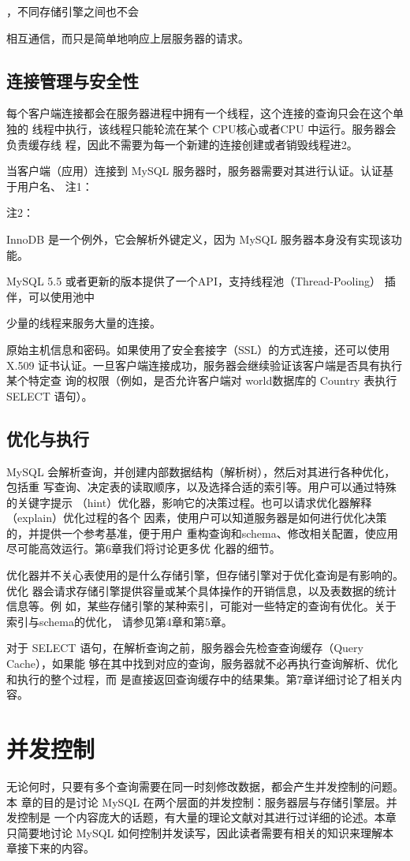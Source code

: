 ，不同存储引擎之间也不会

相互通信，而只是简单地响应上层服务器的请求。

\subsection{连接管理与安全性}
每个客户端连接都会在服务器进程中拥有一个线程，这个连接的查询只会在这个单独的
线程中执行，该线程只能轮流在某个 CPU核心或者CPU 中运行。服务器会负责缓存线
程，因此不需要为每一个新建的连接创建或者销毁线程进2。

当客户端（应用）连接到 MySQL 服务器时，服务器需要对其进行认证。认证基于用户名、
注1：

注2：

InnoDB 是一个例外，它会解析外键定义，因为 MySQL 服务器本身没有实现该功能。

MySQL 5.5 或者更新的版本提供了一个API，支持线程池（Thread-Pooling） 插伴，可以使用池中

少量的线程来服务大量的连接。

原始主机信息和密码。如果使用了安全套接字（SSL）的方式连接，还可以使用X.509
证书认证。一旦客户端连接成功，服务器会继续验证该客户端是否具有执行某个特定查
询的权限（例如，是否允许客户端对 world数据库的 Country 表执行 SELECT 语句）。

\subsection{优化与执行}
MySQL 会解析查询，并创建内部数据结构（解析树），然后对其进行各种优化，包括重
写查询、决定表的读取顺序，以及选择合适的索引等。用户可以通过特殊的关键字提示
（hint）优化器，影响它的决策过程。也可以请求优化器解释（explain）优化过程的各个
因素，使用户可以知道服务器是如何进行优化决策的，并提供一个参考基准，便于用户
重构查询和schema、修改相关配置，使应用尽可能高效运行。第6章我们将讨论更多优
化器的细节。

优化器并不关心表使用的是什么存储引擎，但存储引擎对于优化查询是有影响的。优化
器会请求存储引擎提供容量或某个具体操作的开销信息，以及表数据的统计信息等。例
如，某些存储引擎的某种索引，可能对一些特定的查询有优化。关于索引与schema的优化，
请参见第4章和第5章。

对于 SELECT 语句，在解析查询之前，服务器会先检查查询缓存（Query Cache），如果能
够在其中找到对应的查询，服务器就不必再执行查询解析、优化和执行的整个过程，而
是直接返回查询缓存中的结果集。第7章详细讨论了相关内容。

\section{并发控制}
无论何时，只要有多个查询需要在同一时刻修改数据，都会产生并发控制的问题。本
章的目的是讨论 MySQL 在两个层面的并发控制：服务器层与存储引擎层。并发控制是
一个内容庞大的话题，有大量的理论文献对其进行过详细的论述。本章只简要地讨论
MySQL 如何控制并发读写，因此读者需要有相关的知识来理解本章接下来的内容。

